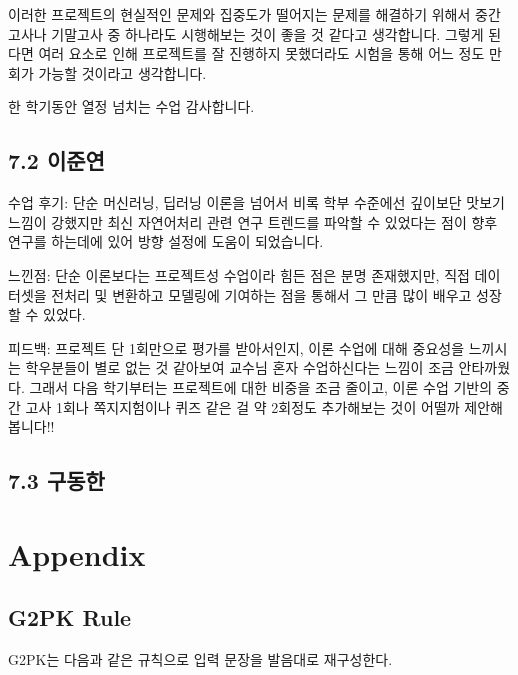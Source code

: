 \documentclass[letterpaper]{article} %
\begin{document}
이러한 프로젝트의 현실적인 문제와 집중도가 떨어지는 문제를 해결하기 위해서 중간고사나 기말고사 중 하나라도 시행해보는 것이 좋을 것 같다고 생각합니다. 그렇게 된다면 여러 요소로 인해 프로젝트를 잘 진행하지 못했더라도 시험을 통해 어느 정도 만회가 가능할 것이라고 생각합니다.

한 학기동안 열정 넘치는 수업 감사합니다.

\subsection{7.2 이준연}
수업 후기: 단순 머신러닝, 딥러닝 이론을 넘어서 비록 학부 수준에선 깊이보단 맛보기 느낌이 강했지만 최신 자연어처리 관련 연구 트렌드를 파악할 수 있었다는 점이 향후 연구를 하는데에 있어 방향 설정에 도움이 되었습니다.

느낀점: 단순 이론보다는 프로젝트성 수업이라 힘든 점은 분명 존재했지만, 직접 데이터셋을 전처리 및 변환하고 모델링에 기여하는 점을 통해서 그 만큼 많이 배우고 성장할 수 있었다. 

피드백: 프로젝트 단 1회만으로 평가를 받아서인지, 이론 수업에 대해 중요성을 느끼시는 학우분들이 별로 없는 것 같아보여 교수님 혼자 수업하신다는 느낌이 조금 안타까웠다. 그래서 다음 학기부터는 프로젝트에 대한 비중을 조금 줄이고, 이론 수업 기반의 중간 고사 1회나 쪽지지험이나 퀴즈 같은 걸 약 2회정도 추가해보는 것이 어떨까 제안해 봅니다!!

\subsection{7.3 구동한}


\section{Appendix}
\subsection{G2PK Rule} \label{sec:g2pk_rule}
G2PK는 다음과 같은 규칙으로 입력 문장을 발음대로 재구성한다.
\end{document}
